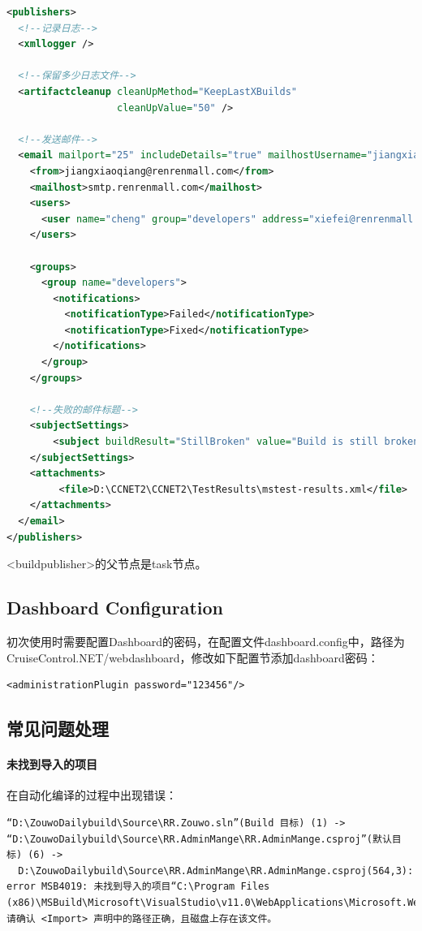 \documentclass{book}
\begin{document}
\begin{lstlisting}[language=XML]
<publishers>  
  <!--记录日志-->  
  <xmllogger />  
    
  <!--保留多少日志文件-->  
  <artifactcleanup cleanUpMethod="KeepLastXBuilds"  
                   cleanUpValue="50" />  
    
  <!--发送邮件-->  
  <email mailport="25" includeDetails="true" mailhostUsername="jiangxiaoqiang@renrenmall.com" mailhostPassword="123456" useSSL="FALSE">  
    <from>jiangxiaoqiang@renrenmall.com</from>  
    <mailhost>smtp.renrenmall.com</mailhost>  
    <users>  
      <user name="cheng" group="developers" address="xiefei@renrenmall.com" />  
    </users>  

    <groups>  
      <group name="developers">  
        <notifications>  
          <notificationType>Failed</notificationType>  
          <notificationType>Fixed</notificationType>  
        </notifications>  
      </group>
    </groups> 

    <!--失败的邮件标题-->  
    <subjectSettings>  
        <subject buildResult="StillBroken" value="Build is still broken for {CCNetProject}" />  
    </subjectSettings>  
    <attachments>  
         <file>D:\CCNET2\CCNET2\TestResults\mstest-results.xml</file>  
    </attachments>
  </email>  
</publishers>
\end{lstlisting}

<buildpublisher>的父节点是task节点。

\subsection{Dashboard Configuration}

初次使用时需要配置Dashboard的密码，在配置文件dashboard.config中，路径为CruiseControl.NET/webdashboard，修改如下配置节添加dashboard密码：
\begin{lstlisting}
<administrationPlugin password="123456"/>
\end{lstlisting}

\subsection{常见问题处理}

\paragraph{未找到导入的项目}在自动化编译的过程中出现错误：

\begin{lstlisting}
“D:\ZouwoDailybuild\Source\RR.Zouwo.sln”(Build 目标) (1) ->
“D:\ZouwoDailybuild\Source\RR.AdminMange\RR.AdminMange.csproj”(默认目标) (6) ->
  D:\ZouwoDailybuild\Source\RR.AdminMange\RR.AdminMange.csproj(564,3): error MSB4019: 未找到导入的项目“C:\Program Files (x86)\MSBuild\Microsoft\VisualStudio\v11.0\WebApplications\Microsoft.WebApplication.targets”。请确认 <Import> 声明中的路径正确，且磁盘上存在该文件。
\end{lstlisting}
\end{document}
